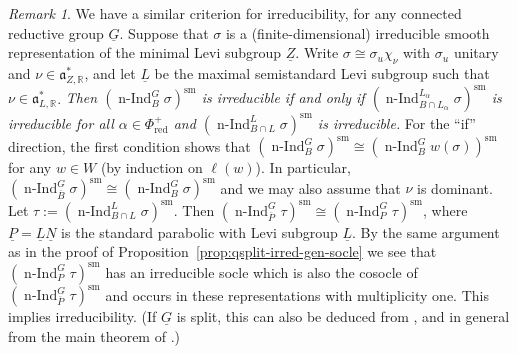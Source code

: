 \documentclass[a4paper]{amsart}
\numberwithin{equation}{section}
\theoremstyle{remark}
\newtheorem{remark}[thm]{Remark}
\theoremstyle{definition}
\DeclareMathOperator{\nInd}{n-Ind}
\newcommand{\R}{\mathbb{R}}
\newcommand{\sm}{\mathrm{sm}}
\newcommand{\alggrp}[1]{\underline{#1}}
\newcommand{\red}{\mathrm{red}}
\renewcommand{\o}[1]{\overline{#1}}
\begin{document}
\begin{remark}\label{rk:irred-smooth-princ-series}
  We have a similar criterion for irreducibility, for any connected reductive group $\alggrp{G}$.
  Suppose that $\sigma$ is a (finite-dimensional) irreducible smooth representation of the minimal Levi subgroup $\alggrp{Z}$.
  Write $\sigma \cong \sigma_u \chi_\nu$ with $\sigma_u$ unitary and $\nu \in \mathfrak a_{Z,\R}^*$, and let $\alggrp{L}$ be the maximal semistandard Levi subgroup such that $\nu \in \mathfrak{a}^{*}_{L,\R}$. 
  \emph{Then $(\nInd_{B}^{G} \sigma)^{\sm}$ is irreducible if and only if $(\nInd_{B \cap L_\alpha}^{L_\alpha} \sigma)^{\sm}$
  is irreducible for all $\alpha \in \Phi^+_{\red}$ and $(\nInd_{B \cap L}^{L} \sigma)^{\sm}$ is irreducible.}
  For the ``if'' direction, the first condition shows that $(\nInd_{B}^{G} \sigma)^{\sm} \cong (\nInd_{B}^{G} w(\sigma))^{\sm}$ for any $w \in W$ (by induction on $\ell(w)$).
  In particular, $(\nInd_{\o B}^{G} \sigma)^{\sm} \cong (\nInd_{B}^{G} \sigma)^{\sm}$ and we may also assume that $\nu$ is dominant. 
  Let $\tau := (\nInd_{B \cap L}^{L} \sigma)^{\sm}$.   Then $(\nInd_{\o P}^{G} \tau)^{\sm} \cong (\nInd_{P}^{G} \tau)^{\sm}$, where $\alggrp{P} = \alggrp{L}\alggrp{N}$ is the standard parabolic with Levi subgroup $\alggrp{L}$.
  By the same argument as in the proof of Proposition~\ref{prop:qsplit-irred-gen-socle} we see that $(\nInd_{P}^{G} \tau)^{\sm}$ has an irreducible socle which is also the cosocle of $(\nInd_{\o P}^{G} \tau)^{\sm}$ and occurs in these representations with multiplicity one.
  This implies irreducibility.  
  (If $\alggrp G$ is split, this can also be deduced from \cite[Proposition 4.2]{MR560847}, and in general from the main theorem of \cite{luo}.)
\end{remark}
\end{document}
